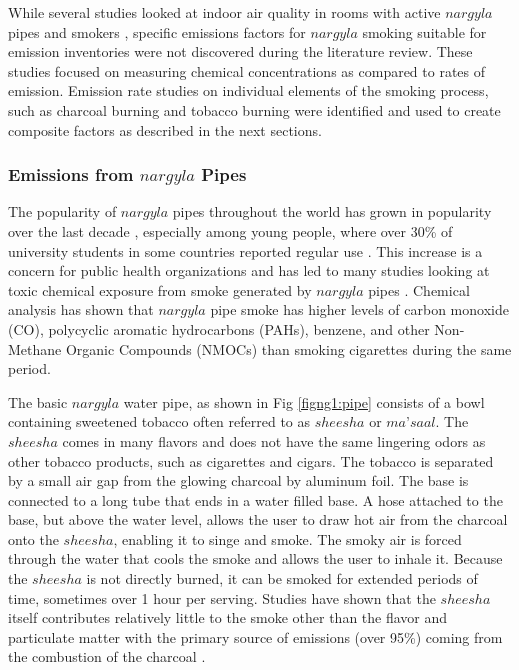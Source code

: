 While several studies looked at indoor air quality in rooms with active $nargyla$ pipes and smokers \citep{Fromme2009, Moon2015, Mulla2015}, specific emissions factors for $nargyla$ smoking suitable for emission inventories were not discovered during the literature review. These studies focused on measuring chemical concentrations as compared to rates of emission. Emission rate studies on individual elements of the smoking process, such as charcoal burning and tobacco burning were identified and used to create composite factors as described in the next sections. 

\subsubsection{Emissions from $nargyla$ Pipes}
The popularity of $nargyla$ pipes throughout the world has grown in popularity over the last decade \citep{Chaouachi2009, Monzer2008}, especially among young people, where over 30\% of university students in some countries reported regular use \citep{Eissenberg2009}. This increase is a concern for public health organizations and has led to many studies looking at toxic chemical exposure from smoke generated by $nargyla$ pipes \citep{Daher2010, Eissenberg2009, Monzer2008, Sepetdjian2010, Shihadeh2005}.  Chemical analysis has shown that $nargyla$ pipe smoke has higher levels of carbon monoxide (CO), polycyclic aromatic hydrocarbons (PAHs), benzene, and other Non-Methane Organic Compounds (NMOCs) than smoking cigarettes during the same period.

The basic $nargyla$ water pipe, as shown in Fig \ref{figng1:pipe} consists of a bowl containing sweetened tobacco often referred to as $sheesha$ or $ma’saal$.  The $sheesha$ comes in many flavors and does not have the same lingering odors as other tobacco products, such as cigarettes and cigars.  The tobacco is separated by a small air gap from the glowing charcoal by aluminum foil.  The base is connected to a long tube that ends in a water filled base.  A hose attached to the base, but above the water level, allows the user to draw hot air from the charcoal onto the $sheesha$, enabling it to singe and smoke.  The smoky air is forced through the water that cools the smoke and allows the user to inhale it.  Because the $sheesha$ is not directly burned, it can be smoked for extended periods of time, sometimes over 1 hour per serving.  Studies have shown that the $sheesha$ itself contributes relatively little to the smoke other than the flavor and particulate matter with the primary source of emissions (over 95\%) coming from the combustion of the charcoal \citep{Sepetdjian2010}.

